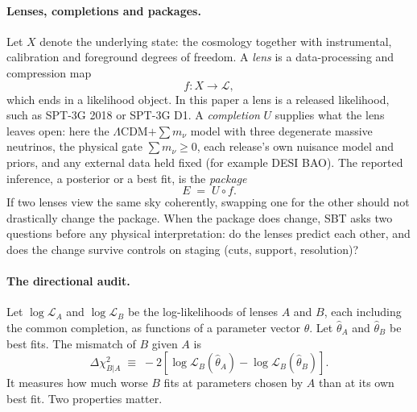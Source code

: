 \documentclass[11pt]{article}
\theoremstyle{remark}
\newcommand{\Lens}{f}
\newcommand{\Completion}{U}
\newcommand{\Pack}{E}
\newcommand{\dchi}{\Delta \chi^2}
\newcommand{\mnu}{\sum m_\nu}
\numberwithin{equation}{section}
\begin{document}
\paragraph{Lenses, completions and packages.}
Let $X$ denote the underlying state: the cosmology together with instrumental, calibration and foreground degrees of freedom. A \emph{lens} is a data-processing and compression map
\begin{equation}
  \Lens : X \to \mathcal{L},
  \label{eq:lens_map}
\end{equation}
which ends in a likelihood object. In this paper a lens is a released likelihood, such as SPT-3G 2018 or SPT-3G D1. A \emph{completion} $\Completion$ supplies what the lens leaves open: here the $\Lambda$CDM$+\mnu$ model with three degenerate massive neutrinos, the physical gate $\mnu\ge0$, each release's own nuisance model and priors, and any external data held fixed (for example DESI BAO). The reported inference, a posterior or a best fit, is the \emph{package}
\begin{equation}
  \Pack \;=\; \Completion\circ\Lens .
  \label{eq:packaging_def}
\end{equation}
If two lenses view the same sky coherently, swapping one for the other should not drastically change the package. When the package does change, SBT asks two questions before any physical interpretation: do the lenses predict each other, and does the change survive controls on staging (cuts, support, resolution)?

\paragraph{The directional audit.}
Let $\log\mathcal{L}_A$ and $\log\mathcal{L}_B$ be the log-likelihoods of lenses $A$ and $B$, each including the common completion, as functions of a parameter vector $\theta$. Let $\hat\theta_A$ and $\hat\theta_B$ be best fits. The mismatch of $B$ given $A$ is
\begin{equation}
  \dchi_{B|A} \;\equiv\; -2\left[\log \mathcal{L}_B(\hat\theta_A) - \log \mathcal{L}_B(\hat\theta_B)\right].
  \label{eq:dchi_def}
\end{equation}
It measures how much worse $B$ fits at parameters chosen by $A$ than at its own best fit. Two properties matter.
\end{document}
